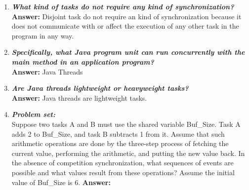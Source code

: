 \documentclass{article}
\begin{document}
\begin{enumerate}[(1)]
\item 
\textbf{\textit{What kind of tasks do not require any kind of synchronization?}}\\
\textbf{Answer: } Disjoint task do not require an kind of synchronization because it does not communicate with or affect the execution of any other task in the program in any way.

\item 
\textbf{\textit{Specifically, what Java program unit can run concurrently with the main method in an application program?}}\\
\textbf{Answer: } Java Threads  

\item 
\textbf{\textit{Are Java threads lightweight or heavyweight tasks?}}\\
\textbf{Answer:} Java threads are lightweight tasks.

\item 
\textbf{\textit{Problem set:}}\\
 Suppose two tasks A and B must use the shared variable Buf\_Size. Task A adds 2 to Buf\_Size, and task B subtracts 1 from it. Assume that such arithmetic operations are done by the three-step process of fetching the current value, performing the arithmetic, and putting the new value back. In the absence of competition synchronization, what sequences of events are possible and what values result from these operations? Assume the initial value of Buf\_Size is 6.
\textbf{Answer: }  

\end{enumerate}
\end{document}
